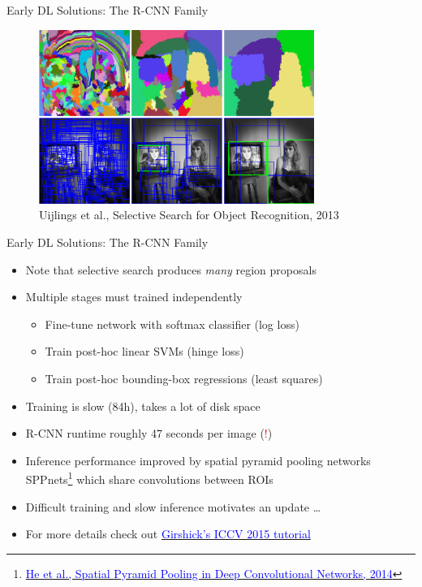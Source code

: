 \documentclass[handout]{beamer}
\begin{document}
\begin{frame}{Early DL Solutions: The R-CNN Family}
\begin{figure}
	\centering
	\includegraphics[width=0.8\textwidth,keepaspectratio]{../media/selective-search-example.png}
	\caption{Uijlings et al., Selective Search for Object Recognition, 2013}
\end{figure}
\end{frame}

\begin{frame}{Early DL Solutions: The R-CNN Family}
\begin{itemize} 
\itemsep 0.8em
	\item<1->Note that selective search produces \emph{many} region proposals 
	\item<2->Multiple stages must trained independently
	\begin{itemize}[square]
		\item<1->Fine-tune network with softmax classifier (log loss)
		\item<2->Train post-hoc linear SVMs (hinge loss)
		\item<3->Train post-hoc bounding-box regressions (least squares)
	\end{itemize}
	\item<3->Training is slow (84h), takes a lot of disk space
	\item<4->R-CNN runtime roughly 47 seconds per image (\textcolor{red}{!})
	\item<5>Inference performance improved by spatial pyramid pooling networks SPPnets\footnote{\href{https://arxiv.org/abs/1406.4729}{\textcolor{blue}{He et al., Spatial Pyramid Pooling in Deep Convolutional Networks, 2014}}} which share convolutions between ROIs
	\item<6->Difficult training and slow inference motivates an update \ldots
	\item<7->For more details check out \href{http://mp7.watson.ibm.com/ICCV2015/ObjectDetectionICCV2015.html}{\textcolor{blue}{Girshick's ICCV 2015 tutorial}}
\end{itemize}
\end{frame}
\end{document}
